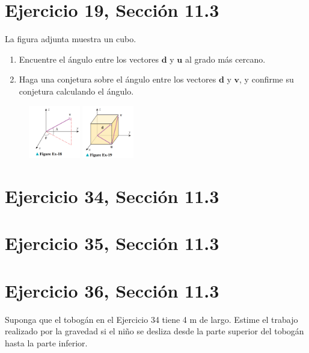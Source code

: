 \documentclass[11pt,letterpaper]{article}
\begin{document}
\section{Ejercicio 19, Sección 11.3}
La figura adjunta muestra un cubo.
\begin{enumerate}
    \item Encuentre el ángulo entre los vectores $\mathbf{d}$ y $\mathbf{u}$ al grado más cercano.
    \item Haga una conjetura sobre el ángulo entre los vectores $\mathbf{d}$ y $\mathbf{v}$, y confirme su conjetura calculando el ángulo.
\end{enumerate}

\begin{figure}[h]
    \centering
    \includegraphics[width=0.2\textwidth]{imagenes/Figure_Ex-18.png}
    \hspace{5cm}
    \includegraphics[width=0.2\textwidth]{imagenes/Figure_Ex-19.png}
\end{figure}


\section{Ejercicio 34, Sección 11.3}

\section{Ejercicio 35, Sección 11.3}

\section{Ejercicio 36, Sección 11.3}

Suponga que el tobogán en el Ejercicio 34 tiene 4 m de largo. Estime el trabajo realizado por la gravedad si el niño se desliza desde la parte superior del tobogán hasta la parte inferior.
\end{document}
